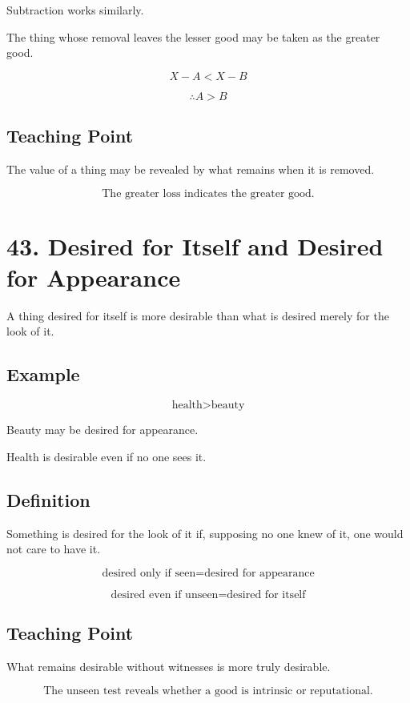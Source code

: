 \documentclass[12pt]{article}
\begin{document}
Subtraction works similarly.

The thing whose removal leaves the lesser good may be taken as the greater
good.

\[
X - A < X - B
\]

\[
\therefore A > B
\]

\subsection*{Teaching Point}

The value of a thing may be revealed by what remains when it is removed.

\[
\boxed{
\text{The greater loss indicates the greater good.}
}
\]

\section*{43. Desired for Itself and Desired for Appearance}

A thing desired for itself is more desirable than what is desired merely for the
look of it.

\subsection*{Example}

\[
\text{health} > \text{beauty}
\]

Beauty may be desired for appearance.

Health is desirable even if no one sees it.

\subsection*{Definition}

Something is desired for the look of it if, supposing no one knew of it, one
would not care to have it.

\[
\text{desired only if seen} = \text{desired for appearance}
\]

\[
\text{desired even if unseen} = \text{desired for itself}
\]

\subsection*{Teaching Point}

What remains desirable without witnesses is more truly desirable.

\[
\boxed{
\text{The unseen test reveals whether a good is intrinsic or reputational.}
}
\]
\end{document}
